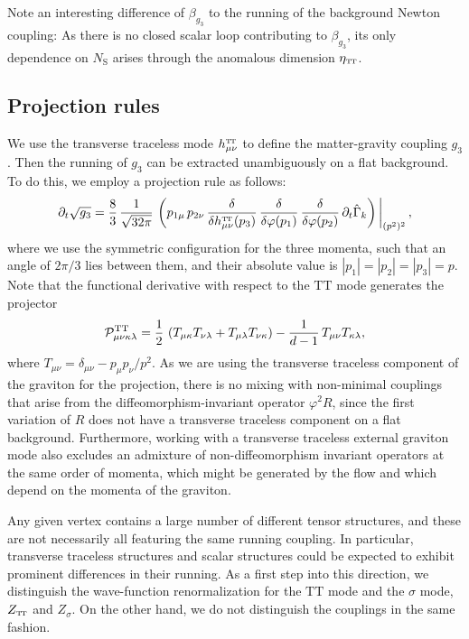 \documentclass[11pt]{book}
\newcommand\TTspace{ -1pt }
\newcommand\hTTmunu{ h^{\scriptscriptstyle{\mathrm{T\hspace{\TTspace}T}}}_{\mu\nu} }
\newcommand\etaTT{ \eta_{\scriptscriptstyle{\mathrm{T\hspace{\TTspace}T}}} }
\newcommand\ZTT{ Z_{\scriptscriptstyle{\mathrm{T\hspace{\TTspace}T}}} }
\newcommand\NS{ N_{\scriptscriptstyle{\mathrm{S}}} }
\numberwithin{equation}{chapter}
\begin{document}
Note an interesting difference of $\beta_{g_3}$ to the running of the background Newton coupling:
As there is no closed scalar loop contributing to $\beta_{g_3}$,
its only dependence on $\NS$ arises through the anomalous dimension $\etaTT$.


\subsection{Projection rules}

We use the transverse traceless mode $\hTTmunu$
to define the matter-gravity coupling $g_3$.
Then the running of $g_3$ can be extracted unambiguously on a flat background.
To do this, we employ a projection rule as follows:
\begin{align}
  \partial_t \sqrt{g_3} = \frac{8}{3} \, \frac{1}{\sqrt{32 \pi}} \,
  \left(
    p_{1\mu} \, p_{2\nu}  \,
    \frac{\delta}{\delta \hTTmunu(p_3)} \, \frac{\delta}{\delta\varphi(p_1)} \, \frac{\delta}{\delta\varphi(p_2)} \,
    \partial_t \hat \Gamma_k
  \right) \bigg|_{(p^2)^2} \,,
  \label{projectiong3}
\end{align}
where we use the symmetric configuration for the three momenta,
such that an angle of $2\pi/3$ lies between them, and their absolute value is $|p_1| = |p_2|=|p_3| =p$.
Note that the functional derivative with respect to the $\mathrm{TT}$ mode generates the projector
\begin{align}
  \mathcal{P}^{\rm TT}_{\mu\nu\kappa\lambda} = \frac{1}{2} \,
  \left(
    T_{\mu
    \kappa}T_{\nu \lambda}
    + T_{\mu\lambda}T_{\nu \kappa}
  \right)
  - \frac{1}{d-1} \, T_{\mu\nu}T_{\kappa\lambda},
  \label{projector}
\end{align}
where $T_{\mu \nu}=\delta_{\mu\nu}-p_{\mu}p_{\nu}/p^2$.
As we are using the transverse traceless component of the graviton for the projection,
there is no mixing with non-minimal couplings that arise from the diffeomorphism-invariant
operator $\varphi^2 R$, since the first variation of $R$ does not have a transverse traceless
component  on a flat background.
Furthermore, working with a transverse traceless external graviton mode also excludes an admixture
of non-diffeomorphism invariant operators at the same order of momenta,
which might be generated by the flow and which depend on the momenta of the graviton.

Any given vertex contains a large number of different tensor structures,
and these are not necessarily all featuring the same running coupling.
In particular, transverse traceless structures and scalar structures could be expected to exhibit
prominent differences in their running. As a first step into this direction,
we distinguish the wave-function renormalization for the $\mathrm{TT}$ mode and the $\sigma$ mode,
$\ZTT$ and $Z_{\sigma}$. On the other hand, we do not distinguish the couplings in the same fashion.
\end{document}
